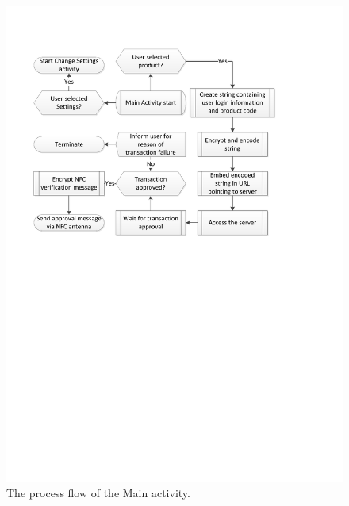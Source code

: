 \begin{figure}
 \centering 
 \includegraphics[clip = true, trim = 0 430 50 70,
 scale=0.7]{app_main_processflow}
 \caption{The process flow of the Main activity.}
 \label{fig:main-activity}
\end{figure}

